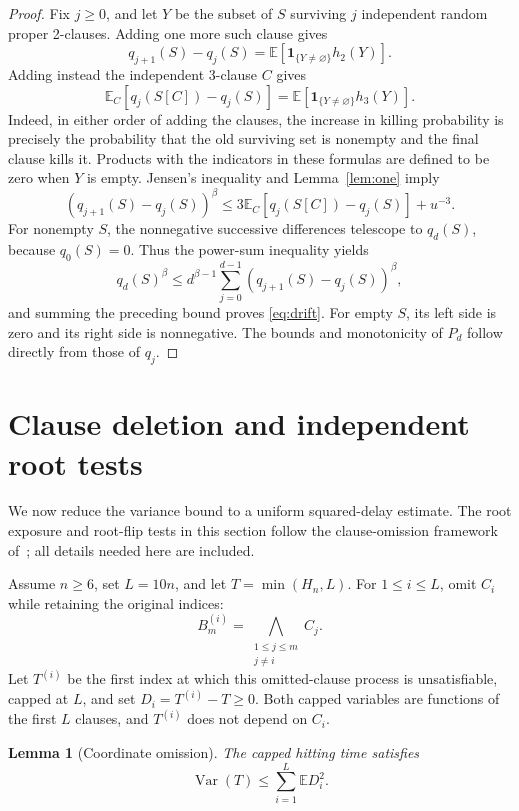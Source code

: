 \documentclass[11pt]{article}
\newtheorem{lemma}[theorem]{Lemma}
\theoremstyle{remark}
\newcommand{\E}{\mathbb E}
\newcommand{\Var}{\operatorname{Var}}
\newcommand{\ind}{\mathbf 1}
\numberwithin{equation}{section}
\begin{document}
\begin{proof}
Fix $j\ge0$, and let $Y$ be the subset of $S$ surviving $j$ independent
random proper 2-clauses. Adding one more such clause gives
\begin{equation}
 q_{j+1}(S)-q_j(S)=\E[\ind_{\{Y\ne\varnothing\}}h_2(Y)].
 \label{eq:two-increment}
\end{equation}
Adding instead the independent 3-clause $C$ gives
\begin{equation}
 \E_C[q_j(S[C])-q_j(S)]
   =\E[\ind_{\{Y\ne\varnothing\}}h_3(Y)].
 \label{eq:three-increment}
\end{equation}
Indeed, in either order of adding the clauses, the increase in killing
probability is precisely the probability that the old surviving set
is nonempty and the final clause kills it. Products with the indicators
in these formulas are defined to be zero when $Y$ is empty.
Jensen's inequality and Lemma~\ref{lem:one} imply
\[
 (q_{j+1}(S)-q_j(S))^\beta
 \le3\E_C[q_j(S[C])-q_j(S)]+u^{-3}.
\]
For nonempty $S$, the nonnegative successive differences telescope to
$q_d(S)$, because $q_0(S)=0$. Thus the power-sum inequality yields
\[
 q_d(S)^\beta
 \le d^{\beta-1}\sum_{j=0}^{d-1}(q_{j+1}(S)-q_j(S))^\beta,
\]
and summing the preceding bound proves \eqref{eq:drift}.
For empty $S$, its left side is zero and its right side is nonnegative.
The bounds and monotonicity of $P_d$ follow directly from those of $q_j$.
\end{proof}

\section{Clause deletion and independent root tests}
\label{sec:deletion}

We now reduce the variance bound to a uniform squared-delay estimate.
The root exposure and root-flip tests in this section follow the
clause-omission framework of~\cite[Section~3]{OpenAI2026Variance};
all details needed here are included.

Assume $n\ge6$, set $L=10n$, and let $T=\min(H_n,L)$.
For $1\le i\le L$, omit $C_i$ while retaining the original indices:
\[
 B_m^{(i)}=\bigwedge_{\substack{1\le j\le m\\j\ne i}} C_j.
\]
Let $T^{(i)}$ be the first index at which this omitted-clause process
is unsatisfiable, capped at $L$, and set $D_i=T^{(i)}-T\ge0$.
Both capped variables are functions of the first $L$ clauses, and
$T^{(i)}$ does not depend on $C_i$.

\begin{lemma}[Coordinate omission]
\label{lem:omission}
The capped hitting time satisfies
\begin{equation}
 \Var(T)\le\sum_{i=1}^L\E D_i^2.
 \label{eq:variance-deletion}
\end{equation}
\end{lemma}
\end{document}
